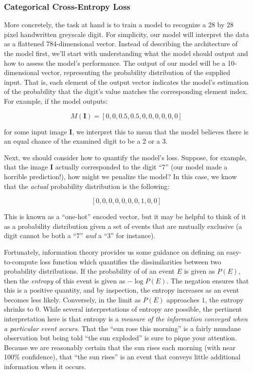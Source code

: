 \documentclass[
]{article}
\begin{document}
\hypertarget{categorical-cross-entropy-loss}{%
\subsubsection{Categorical Cross-Entropy
Loss}\label{categorical-cross-entropy-loss}}

More concretely, the task at hand is to train a model to recognize a 28
by 28 pixel handwritten greyscale digit. For simplicity, our model will
interpret the data as a flattened 784-dimensional vector. Instead of
describing the architecture of the model first, we'll start with
understanding what the model should output and how to assess the model's
performance. The output of our model will be a 10-dimensional vector,
representing the probability distribution of the supplied input. That
is, each element of the output vector indicates the model's estimation
of the probability that the digit's value matches the corresponding
element index. For example, if the model outputs:

\[M(\mathbf{I}) = \left[0, 0, 0.5, 0.5, 0, 0, 0, 0, 0, 0\right]\]

for some input image \(\mathbf{I}\), we interpret this to mean that the
model believes there is an equal chance of the examined digit to be a 2
or a 3.

Next, we should consider how to quantify the model's loss. Suppose, for
example, that the image \(\mathbf{I}\) actually corresponded to the
digit ``7'' (our model made a horrible prediction!), how might we
penalize the model? In this case, we know that the \emph{actual}
probability distribution is the following:

\[\left[0, 0, 0, 0, 0, 0, 0, 1, 0, 0\right]\]

This is known as a ``one-hot'' encoded vector, but it may be helpful to
think of it as a probability distribution given a set of events that are
mutually exclusive (a digit cannot be both a ``7'' \emph{and} a ``3''
for instance).

Fortunately, information theory provides us some guidance on defining an
easy-to-compute loss function which quantifies the dissimilarities
between two probability distributions. If the probability of of an event
\(E\) is given as \(P(E)\), then the \emph{entropy} of this event is
given as \(-\log P(E)\). The negation ensures that this is a positive
quantity, and by inspection, the entropy increases as an event becomes
less likely. Conversely, in the limit as \(P(E)\) approaches \(1\), the
entropy shrinks to \(0\). While several interpretations of entropy are
possible, the pertinent interpretation here is that entropy is a
\emph{measure of the information conveyed when a particular event
occurs}. That the ``sun rose this morning'' is a fairly mundane
observation but being told ``the sun exploded'' is sure to pique your
attention. Because we are reasonably certain that the sun rises each
morning (with near 100\% confidence), that ``the sun rises'' is an event
that conveys little additional information when it occurs.
\end{document}
